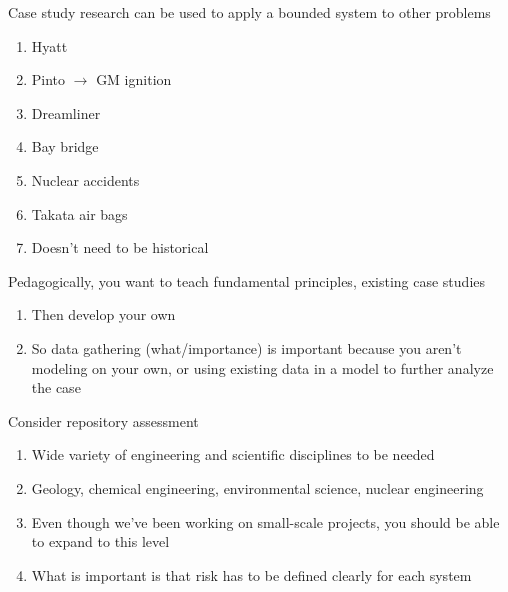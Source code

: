 \documentclass[aspectratio=1610,pdftex,dvipsnames,compress,xcolor={dvipsnames}]{beamer}
\begin{document}
\addtocounter{framenumber}{-1}
\begin{frame}{Case study research can be used to apply a bounded system to other problems}
    \begin{enumerate}[series=outerlist,topsep=0pt,itemsep=15pt,leftmargin=*,label=(\arabic*)]
        \item[]Hyatt
        \item[]Pinto $\rightarrow$ GM ignition
        \item[]Dreamliner
        \item[]Bay bridge
        \item[]Nuclear accidents
        \item[]Takata air bags
        \item[]Doesn't need to be historical
    \end{enumerate}
\end{frame}


\begin{frame}{Pedagogically, you want to teach fundamental principles, existing case studies}
    \begin{enumerate}[series=outerlist,topsep=0pt,itemsep=21pt,leftmargin=*,label=(\arabic*)]
        \item[]Then develop your own
        \item[]So data gathering (what/importance) is important because you aren't modeling on your own, or using existing data in a model to further analyze the case
    \end{enumerate}
\end{frame}


\begin{frame}{Consider repository assessment}
    \begin{enumerate}[series=outerlist,topsep=0pt,itemsep=21pt,leftmargin=*,label=(\arabic*)]
        \item[]Wide variety of engineering and scientific disciplines to be needed
        \item[]Geology, chemical engineering, environmental science, nuclear engineering
        \item[]Even though we've been working on small-scale projects, you should be able to expand to this level
        \item[]What is important is that risk has to be defined clearly for each system
    \end{enumerate}
\end{frame}
\end{document}
